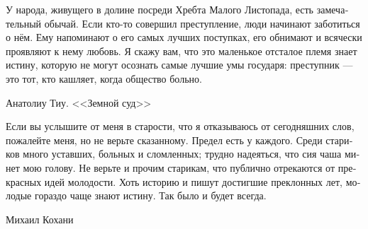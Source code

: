 \documentclass[a4paper,12pt,fleqn]{book}\usepackage{polyglossia}\setdefaultlanguage[babelshorthands=true]{russian}\setotherlanguage{english}\defaultfontfeatures{Ligatures=TeX,Mapping=tex-text}\usepackage{xcolor}\newcommand{\ml}[3]{#2}
\begin{document}
{\epigraph
{У народа, живущего в долине посреди Хребта Малого Листопада, есть замечательный обычай.
Если кто-то совершил преступление, люди начинают заботиться о нём.
Ему напоминают о его самых лучших поступках, его обнимают и всячески проявляют к нему любовь.
Я скажу вам, что это маленькое отсталое племя знает истину, которую не могут осознать самые лучшие умы государя: преступник --- это тот, кто кашляет, когда общество больно.}
{Анатолиу Тиу.
<<Земной суд>>}

\epigraph
{Если вы услышите от меня в старости, что я отказываюсь от сегодняшних слов, пожалейте меня, но не верьте сказанному.
Предел есть у каждого.
Среди стариков много уставших, больных и сломленных;
трудно надеяться, что сия чаша минет мою голову.
Не верьте и прочим старикам, что публично отрекаются от прекрасных идей молодости.
Хоть историю и пишут достигшие преклонных лет, молодые гораздо чаще знают истину.
Так было и будет всегда.}
{Михаил Кохани}

}
\end{document}
